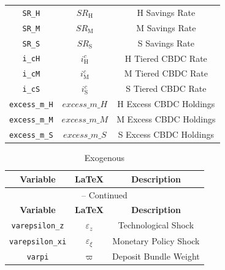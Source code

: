 \begin{center}
\begin{longtable}{ccc}
\texttt{SR\_H} & $SR_\mathrm{H}$ & H Savings Rate\\
\texttt{SR\_M} & $SR_\mathrm{M}$ & M Savings Rate\\
\texttt{SR\_S} & $SR_\mathrm{S}$ & S Savings Rate\\
\texttt{i\_cH} & $i^c_\mathrm{H}$ & H Tiered CBDC Rate\\
\texttt{i\_cM} & $i^c_\mathrm{M}$ & M Tiered CBDC Rate\\
\texttt{i\_cS} & $i^c_\mathrm{S}$ & S Tiered CBDC Rate\\
\texttt{excess\_m\_H} & $excess\_m\_H$ & H Excess CBDC Holdings\\
\texttt{excess\_m\_M} & $excess\_m\_M$ & M Excess CBDC Holdings\\
\texttt{excess\_m\_S} & $excess\_m\_S$ & S Excess CBDC Holdings\\
\hline%
\end{longtable}
\end{center}
\begin{center}
\begin{longtable}{ccc}
\caption{Exogenous}\\%
\hline%
\multicolumn{1}{c}{\textbf{Variable}} &
\multicolumn{1}{c}{\textbf{\LaTeX}} &
\multicolumn{1}{c}{\textbf{Description}}\\%
\hline\hline%
\endfirsthead
\multicolumn{3}{c}{{\tablename} \thetable{} -- Continued}\\%
\hline%
\multicolumn{1}{c}{\textbf{Variable}} &
\multicolumn{1}{c}{\textbf{\LaTeX}} &
\multicolumn{1}{c}{\textbf{Description}}\\%
\hline\hline%
\endhead
\texttt{varepsilon\_z} & $\varepsilon_z$ & Technological Shock\\
\texttt{varepsilon\_xi} & $\varepsilon_\xi$ & Monetary Policy Shock\\
\texttt{varpi} & $\varpi$ & Deposit Bundle Weight\\
\hline%
\end{longtable}
\end{center}
